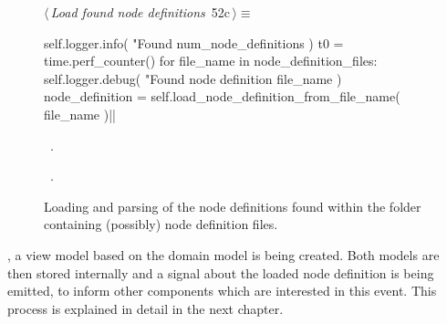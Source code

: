 \documentclass[%
    a4paper,    %
    justified,  %
    nobib,      %
    openany     %
]{tufte-book}
\makeatletter
\renewcommand{\label}[1]{\@tufte@label{##1}}%
\makeatother
\begin{document}
\begin{figure}[!htbp]
  \begin{flushleft} \small
\begin{minipage}{\linewidth}\label{scrap7}\raggedright\small
{} $\langle\,${\itshape Load found node definitions}\nobreak\ {\footnotesize {52c}}$\,\rangle\equiv$
\vspace{-1ex}
\begin{pythoncode}
self.logger.info(
    "Found %
    num_node_definitions
)
t0 = time.perf_counter()
for file_name in node_definition_files:
    self.logger.debug(
        "Found node definition %
        file_name
    )
    node_definition = self.load_node_definition_from_file_name(
        file_name
    )|\NWsep|
\end{pythoncode}
\vspace{1.5ex}
\footnotesize
\begin{list}{}{\setlength{\itemsep}{-\parsep}\setlength{\itemindent}{-\leftmargin}}
\item \NWtxtMacroDefBy\ .
\item \NWtxtMacroRefIn\ .

\item{}
\end{list}
\end{minipage}\vspace{4ex}
\end{flushleft}
\caption{Loading and parsing of the node definitions found within the folder
    containing (possibly) node definition files.}
\end{figure}

\newpage{}

, a view model based on the
domain model is being created. Both models are then stored internally and a
signal about the loaded node definition is being emitted, to inform other
components which are interested in this event. This process is explained in
detail in the next chapter.
\end{document}
